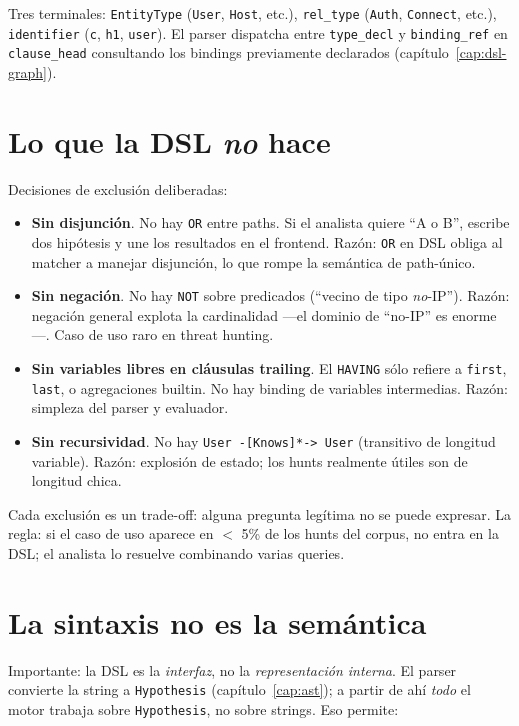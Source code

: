 \noindent
Tres terminales: \texttt{EntityType} (\texttt{User}, \texttt{Host},
etc.), \texttt{rel\_type} (\texttt{Auth}, \texttt{Connect}, etc.),
\texttt{identifier} (\texttt{c}, \texttt{h1}, \texttt{user}). El
parser dispatcha entre \texttt{type\_decl} y \texttt{binding\_ref}
en \texttt{clause\_head} consultando los bindings previamente
declarados (capítulo~\ref{cap:dsl-graph}).

\section{Lo que la DSL \emph{no} hace}

Decisiones de exclusión deliberadas:

\begin{itemize}
    \item \textbf{Sin disjunción}. No hay \texttt{OR} entre paths.
    Si el analista quiere ``A o B'', escribe dos hipótesis y une
    los resultados en el frontend. Razón: \texttt{OR} en DSL
    obliga al matcher a manejar disjunción, lo que rompe la
    semántica de path-único.
    \item \textbf{Sin negación}. No hay \texttt{NOT} sobre
    predicados (``vecino de tipo \emph{no}-IP''). Razón:
    negación general explota la cardinalidad ---el dominio de
    ``no-IP'' es enorme---. Caso de uso raro en threat hunting.
    \item \textbf{Sin variables libres en cláusulas trailing}. El
    \texttt{HAVING} sólo refiere a \texttt{first}, \texttt{last},
    o agregaciones builtin. No hay binding de variables
    intermedias. Razón: simpleza del parser y evaluador.
    \item \textbf{Sin recursividad}. No hay
    \texttt{User -[Knows]*-> User} (transitivo de longitud
    variable). Razón: explosión de estado; los hunts realmente
    útiles son de longitud chica.
\end{itemize}

\noindent
Cada exclusión es un trade-off: alguna pregunta legítima no se
puede expresar. La regla: si el caso de uso aparece en \(<\) 5\%
de los hunts del corpus, no entra en la DSL; el analista lo resuelve
combinando varias queries.

\section{La sintaxis no es la semántica}

Importante: la DSL es la \emph{interfaz}, no la
\emph{representación interna}. El parser convierte la string a
\texttt{Hypothesis} (capítulo~\ref{cap:ast}); a partir de ahí
\emph{todo} el motor trabaja sobre \texttt{Hypothesis}, no sobre
strings. Eso permite:

